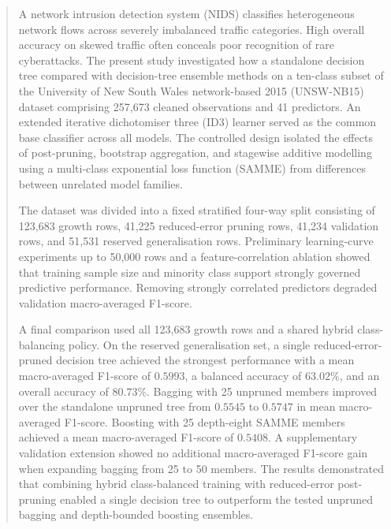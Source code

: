 \begin{abstract}
A network intrusion detection system (NIDS) classifies heterogeneous network flows across severely imbalanced traffic categories. High overall accuracy on skewed traffic often conceals poor recognition of rare cyberattacks. The present study investigated how a standalone decision tree compared with decision-tree ensemble methods on a ten-class subset of the University of New South Wales network-based 2015 (UNSW-NB15) dataset comprising 257,673 cleaned observations and 41 predictors. An extended iterative dichotomiser three (ID3) learner served as the common base classifier across all models. The controlled design isolated the effects of post-pruning, bootstrap aggregation, and stagewise additive modelling using a multi-class exponential loss function (SAMME) from differences between unrelated model families.

The dataset was divided into a fixed stratified four-way split consisting of 123,683 growth rows, 41,225 reduced-error pruning rows, 41,234 validation rows, and 51,531 reserved generalisation rows. Preliminary learning-curve experiments up to 50,000 rows and a feature-correlation ablation showed that training sample size and minority class support strongly governed predictive performance. Removing strongly correlated predictors degraded validation macro-averaged F1-score.

A final comparison used all 123,683 growth rows and a shared hybrid class-balancing policy. On the reserved generalisation set, a single reduced-error-pruned decision tree achieved the strongest performance with a mean macro-averaged F1-score of $0.5993$, a balanced accuracy of $63.02\%$, and an overall accuracy of $80.73\%$. Bagging with 25 unpruned members improved over the standalone unpruned tree from $0.5545$ to $0.5747$ in mean macro-averaged F1-score. Boosting with 25 depth-eight SAMME members achieved a mean macro-averaged F1-score of $0.5408$. A supplementary validation extension showed no additional macro-averaged F1-score gain when expanding bagging from 25 to 50 members. The results demonstrated that combining hybrid class-balanced training with reduced-error post-pruning enabled a single decision tree to outperform the tested unpruned bagging and depth-bounded boosting ensembles.
\end{abstract}
